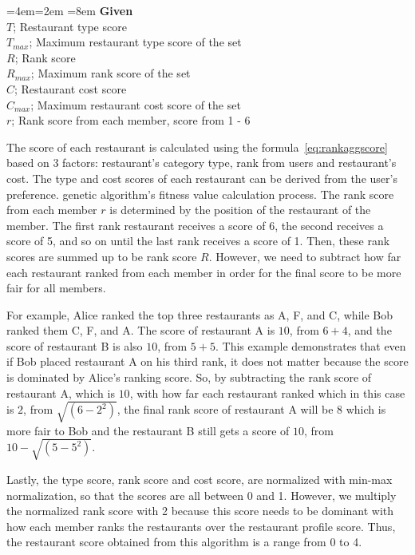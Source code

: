 \documentclass[12pt,oneside,openright,a4paper]{cpe-english-project}
\newenvironment{blockquote}{%
  \par%
  \medskip
  \leftskip=4em\rightskip=2em%
  \noindent\ignorespaces}{%
  \par\medskip}
\begin{document}
\begin{blockquote}\leftskip=8em
\textbf{Given}\\
$T$; Restaurant type score\\
$T_{max}$; Maximum restaurant type score of the set\\
$R$; Rank score\\
$R_{max}$; Maximum rank score of the set\\
$C$; Restaurant cost score\\
$C_{max}$; Maximum restaurant cost score of the set\\
$r$; Rank score from each member, score from 1 - 6
\end{blockquote}

The score of each restaurant is calculated using the formula~\ref{eq:rankaggscore} based on 3 factors: restaurant’s category type, rank from users and restaurant’s cost. The type and cost scores of each restaurant can be derived from the user’s preference. genetic algorithm’s fitness value calculation process. The rank score from each member $r$ is determined by the position of the restaurant of the member.  The first rank restaurant receives a score of 6, the second receives a score of 5, and so on until the last rank receives a score of 1. Then, these rank scores are summed up to be rank score $R$. However, we need to subtract how far each restaurant ranked from each member in order for the final score to be more fair for all members. 

For example, Alice ranked the top three restaurants as A, F, and C, while Bob ranked them C, F, and A. The score of restaurant A is $10$, from $6 + 4$, and the score of restaurant B is also $10$, from $5 + 5$. This example demonstrates that even if Bob placed restaurant A on his third rank, it does not matter because the score is dominated by Alice's ranking score. So, by subtracting the rank score of restaurant A, which is $10$, with how far each restaurant ranked which in this case is $2$, from $\sqrt{(6-2^2)}$, the final rank score of restaurant A will be $8$ which is more fair to Bob and the restaurant B still gets a score of $10$, from $10-\sqrt{(5-5^2)}$.

Lastly, the type score, rank score and cost score, are normalized with min-max normalization, so that the scores are all between 0 and 1. However, we multiply the normalized rank score with 2 because this score needs to be dominant with how each member ranks the restaurants over the restaurant profile score. Thus, the restaurant score obtained from this algorithm is a range from 0 to 4.
\end{document}
